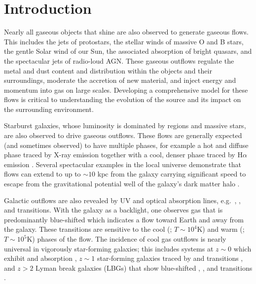 \documentclass[12pt,preprint]{aastex}
\begin{document}
\section{Introduction}
\label{sec:intro}

Nearly all gaseous objects that shine are also
observed to generate gaseous flows.  This includes the jets of protostars, the
stellar winds of massive O and B stars, the gentle Solar wind
of our Sun, the associated absorption of bright quasars, and the
spectacular jets of radio-loud AGN.   These gaseous outflows 
regulate the metal and dust content and distribution within the 
objects and their surroundings, 
moderate the accretion of new material, and %
inject energy and momentum into gas on large scales. %
Developing a comprehensive model for these flows is critical to
understanding the evolution of the source and its impact on the
surrounding environment.

Starburst galaxies, whose luminosity is dominated by  regions
and massive stars, are also observed to drive gaseous outflows.  These
flows are generally expected (and sometimes observed) to have multiple
phases, for example a hot and diffuse phase traced by X-ray emission
together with a cool, denser phase traced by H$\alpha$ emission 
\citep[e.g.][]{ham90,martin99,shc+04,km10}. 
Several spectacular
examples in the local universe demonstrate that flows can extend to
up to $\sim 10$ kpc
from the galaxy \citep{lhw99,vsr+03,wsg08} carrying significant speed
to escape from the gravitational potential well of the galaxy's dark
matter halo \citep[e.g.][]{sh09}.

Galactic outflows are also
revealed by UV and optical absorption lines, e.g.\ ,
,  and  transitions.  With the galaxy
as a backlight, one observes gas that is predominantly
blue-shifted which indicates a flow toward
Earth and away from the galaxy.  These transitions are sensitive to
the cool (; $T \sim 10^4$K) and warm (; $T \sim
10^5$K) phases of the flow.  
The incidence of cool gas outflows is
nearly universal in 
vigorously
star-forming galaxies;  this includes systems at $z \sim 0$
which exhibit  and  absorption
\citep{rvs05a,martin05,smn+09,mb09,cth+10}, 
$z \sim 1$ star-forming galaxies traced by
 and  transitions \citep{wcp+09,rwk+10}, and
$z>2$ Lyman break galaxies (LBGs) that show blue-shifted ,
, and  transitions \citep{sgp+96,lkg+97,shapley03}.
\end{document}
